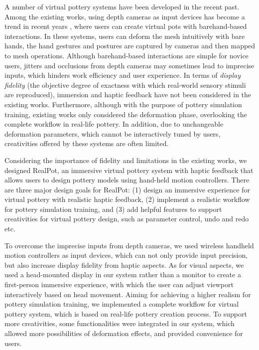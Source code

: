 \documentclass{svjour3}                     %
\begin{document}
A number of virtual pottery systems have been developed in the recent past.
%
Among the existing works, using depth cameras as input devices has become a trend in recent years \cite{ramani2015gesture,murugappan2013handy,han2014virtual,gao2018digiclay} , where users can create virtual pots with barehand-based interactions.
%
In these systems, users can deform the mesh intuitively with bare hands, the hand gestures and postures are captured by cameras and then mapped to mesh operations.
Although barehand-based interactions are simple for novice users, jitters and occlusions from depth cameras may sometimes lead to imprecise inputs, which hinders work efficiency and user experience.
%
In terms of \textit{display fidelity} (the objective degree of exactness with which real-world sensory stimuli are reproduced), immersion and haptic feedback have not been considered in the existing works.
%
Furthermore, although with the purpose of pottery simulation training, existing works only considered the deformation phase, overlooking the complete workflow in real-life pottery.
%
In addition, due to unchangeable deformation parameters, which cannot be interactively tuned by users, creativities offered by these systems are often limited.

Considering the importance of fidelity and limitations in the existing works, we designed RealPot, an immersive virtual pottery system with haptic feedback that allows users to design pottery models using hand-held motion controllers.
%
There are three major design goals for RealPot:
%
(1) design an immersive experience for virtual pottery with realistic haptic feedback,
%
(2) implement a realistic workflow for pottery simulation training, 
%
and (3) add helpful features to support creativities for virtual pottery design, such as parameter control, undo and redo etc. 

To overcome the imprecise inputs from depth cameras, we used wireless handheld motion controllers as input devices, which can not only provide input precision, but also increase display fidelity from haptic aspects.
%
As for visual aspects, we used a head-mounted display in our system rather than a monitor to create a first-person immersive experience, with which the user can adjust viewport interactively based on head movement.
%
Aiming for achieving a higher realism for pottery simulation training, we implemented a complete workflow for virtual pottery system, which is based on real-life pottery creation process.
%
To support more creativities, some functionalities were integrated in our system, which allowed more possibilities of deformation effects, and provided convenience for users.
\end{document}
